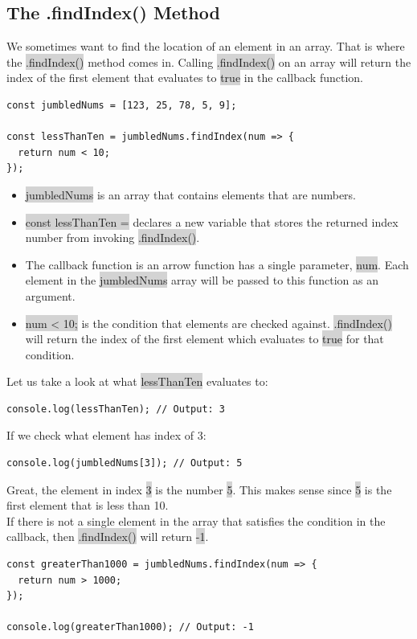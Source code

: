 \documentclass[11pt]{article}
\begin{document}
\subsection{The .findIndex() Method}
We sometimes want to find the location of an element in an array. That is where the \colorbox{lightgray}{.findIndex()} method comes in. Calling \colorbox{lightgray}{.findIndex()} on an array will return the index of the first element that evaluates to \colorbox{lightgray}{true} in the callback function.
\begin{lstlisting}
const jumbledNums = [123, 25, 78, 5, 9]; 

const lessThanTen = jumbledNums.findIndex(num => {
  return num < 10;
});
\end{lstlisting}
\begin{itemize}[leftmargin = *]
\item \colorbox{lightgray}{jumbledNums} is an array that contains elements that are numbers.
\item \colorbox{lightgray}{const lessThanTen =} declares a new variable that stores the returned index number from invoking \colorbox{lightgray}{.findIndex()}.
\item The callback function is an arrow function has a single parameter, \colorbox{lightgray}{num}. Each element in the \colorbox{lightgray}{jumbledNums} array will be passed to this function as an argument.
\item \colorbox{lightgray}{num < 10;} is the condition that elements are checked against. \colorbox{lightgray}{.findIndex()} will return the index of the first element which evaluates to \colorbox{lightgray}{true} for that condition.
\end{itemize}
Let us take a look at what \colorbox{lightgray}{lessThanTen} evaluates to:
\begin{lstlisting}
console.log(lessThanTen); // Output: 3 
\end{lstlisting}
If we check what element has index of 3:
\begin{lstlisting}
console.log(jumbledNums[3]); // Output: 5
\end{lstlisting}
Great, the element in index \colorbox{lightgray}{3} is the number \colorbox{lightgray}{5}. This makes sense since \colorbox{lightgray}{5} is the first element that is less than 10. \\
\newline
If there is not a single element in the array that satisfies the condition in the callback, then \colorbox{lightgray}{.findIndex()} will return \colorbox{lightgray}{-1}.
\begin{lstlisting}
const greaterThan1000 = jumbledNums.findIndex(num => {
  return num > 1000;
});

console.log(greaterThan1000); // Output: -1
\end{lstlisting}
\end{document}
